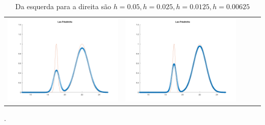 \documentclass{article}
\begin{document}
\begin{table}[h]
\begin{tabular}{ccccc}
            \includegraphics[scale = 0.17]{LF4.png} & \includegraphics[scale = 0.17]{LF8.png}
        \end{tabular}
    \label{tbl:table_of_figures}
    \caption{Da esquerda para a direita são $h = 0.05, h = 0.025,h = 0.0125, h = 0.00625$}.
\end{table}
\newpage
\end{document}
